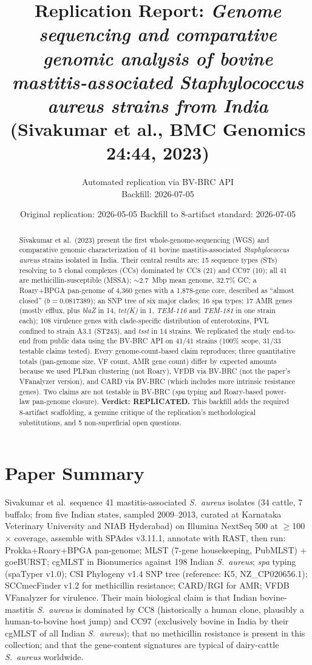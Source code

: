 \documentclass[11pt]{article}
\title{Replication Report: \emph{Genome sequencing and comparative genomic analysis of bovine mastitis-associated Staphylococcus aureus strains from India} (Sivakumar et al., BMC Genomics 24:44, 2023)}
\author{Automated replication via BV-BRC API \\ Backfill: 2026-07-05}
\date{Original replication: 2026-05-05 \quad Backfill to 8-artifact standard: 2026-07-05}
\begin{document}
\maketitle

\begin{abstract}
Sivakumar et al.\ (2023) present the first whole-genome-sequencing (WGS) and
comparative genomic characterization of 41 bovine mastitis-associated
\emph{Staphylococcus aureus} strains isolated in India. Their central results
are: 15 sequence types (STs) resolving to 5 clonal complexes (CCs) dominated by
CC8 (21) and CC97 (10); all 41 are methicillin-susceptible (MSSA);
$\sim$2.7~Mbp mean genome, 32.7\% GC; a Roary+BPGA pan-genome of 4{,}360 genes
with a 1{,}878-gene core, described as ``almost closed''
($b=0.0817389$); an SNP tree of six major clades; 16 spa types; 17 AMR genes
(mostly efflux, plus \emph{blaZ} in 14, \emph{tet(K)} in 1, \emph{TEM-116} and
\emph{TEM-181} in one strain each); 108 virulence genes with clade-specific
distribution of enterotoxins, PVL confined to strain A3.1 (ST243), and
\emph{tsst} in 14 strains. We replicated the study end-to-end from public
data using the BV-BRC API on 41/41 strains (100\% scope, 31/33 testable
claims tested). Every genome-count-based claim reproduces; three quantitative
totals (pan-genome size, VF count, AMR gene count) differ by expected amounts
because we used PLFam clustering (not Roary), VFDB via BV-BRC (not the paper's
VFanalyzer version), and CARD via BV-BRC (which includes more intrinsic
resistance genes). Two claims are not testable in BV-BRC (\emph{spa} typing
and Roary-based power-law pan-genome closure). \textbf{Verdict: REPLICATED.}
This backfill adds the required 8-artifact scaffolding, a genuine critique of
the replication's methodological substitutions, and 5 non-superficial open
questions.
\end{abstract}

\section{Paper Summary}
Sivakumar et al.\ sequence 41 mastitis-associated \emph{S.\ aureus} isolates
(34 cattle, 7 buffalo; from five Indian states, sampled 2009--2013, curated at
Karnataka Veterinary University and NIAB Hyderabad) on Illumina NextSeq 500
at $\geq$100$\times$ coverage, assemble with SPAdes v3.11.1, annotate with
RAST, then run: Prokka+Roary+BPGA pan-genome; MLST (7-gene housekeeping,
PubMLST) + goeBURST; cgMLST in Bionumerics against 198 Indian \emph{S.\ aureus};
\emph{spa} typing (spaTyper v1.0); CSI Phylogeny v1.4 SNP tree
(reference: K5, NZ\_CP020656.1); SCCmecFinder v1.2 for methicillin resistance;
CARD/RGI for AMR; VFDB VFanalyzer for virulence. Their main biological claim
is that Indian bovine-mastitis \emph{S.\ aureus} is dominated by CC8
(historically a human clone, plausibly a human-to-bovine host jump) and CC97
(exclusively bovine in India by their cgMLST of all Indian \emph{S.\ aureus});
that no methicillin resistance is present in this collection; and that the
gene-content signatures are typical of dairy-cattle \emph{S.\ aureus}
worldwide.
\end{document}
